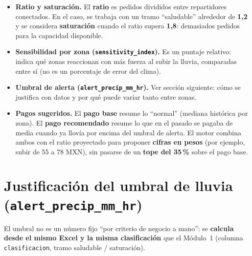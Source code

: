 \documentclass[11pt,a4paper]{article}
\begin{document}
\begin{itemize}
  \item \textbf{Ratio y saturación.} El \textbf{ratio} es pedidos divididos entre repartidores conectados. En el caso, se trabaja con un tramo ``saludable'' alrededor de \textbf{1{,}2} y se considera \textbf{saturación} cuando el ratio supera \textbf{1{,}8}: demasiados pedidos para la capacidad disponible.
  \item \textbf{Sensibilidad por zona (\texttt{sensitivity\_index}).} Es un puntaje relativo: indica qué zonas reaccionan con más fuerza al subir la lluvia, comparadas entre sí (no es un porcentaje de error del clima).
  \item \textbf{Umbral de alerta (\texttt{alert\_precip\_mm\_hr}).} Ver sección siguiente: cómo se justifica con datos y por qué puede variar tanto entre zonas.
  \item \textbf{Pagos sugeridos.} El \textbf{pago base} resume lo ``normal'' (mediana histórica por zona). El \textbf{pago recomendado} resume lo que en el pasado se pagaba de media cuando ya llovía por encima del umbral de alerta. El motor combina ambos con el ratio proyectado para proponer \textbf{cifras en pesos} (por ejemplo, subir de 55 a 78 MXN), sin pasarse de un \textbf{tope del 35\,\%} sobre el pago base.
\end{itemize}

\section*{Justificación del umbral de lluvia (\texttt{alert\_precip\_mm\_hr})}

\noindent El umbral no es un número fijo ``por criterio de negocio a mano'': se \textbf{calcula desde el mismo Excel y la misma clasificación} que el Módulo~1 (columna \texttt{clasificacion}, tramo saludable / saturación).
\end{document}
